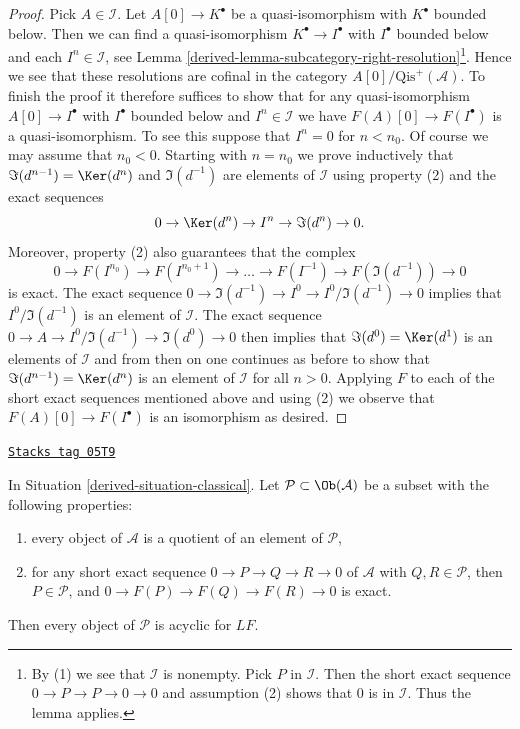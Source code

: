 \begin{proof}

Pick $A \in \mathcal{I}$. Let $A[0] \to K^\bullet$
be a quasi-isomorphism with $K^\bullet$
bounded below. Then we can find a quasi-isomorphism
$K^\bullet \to I^\bullet$ with $I^\bullet$ bounded below and
each $I^n \in \mathcal{I}$, see
Lemma \ref{derived-lemma-subcategory-right-resolution}\footnote{By (1)
we see that $\mathcal{I}$ is nonempty. Pick $P$ in $\mathcal{I}$.
Then the short exact sequence $0 \to P \to P \to 0 \to 0$ and assumption (2)
shows that $0$ is in $\mathcal{I}$. Thus the lemma applies.}.
Hence we see that these resolutions are cofinal in the category
$A[0]/\text{Qis}^{+}(\mathcal{A})$. To finish the proof it therefore
suffices to show that for any quasi-isomorphism
$A[0] \to I^\bullet$ with $I^\bullet$ bounded below and $I^n \in \mathcal{I}$
we have $F(A)[0] \to F(I^\bullet)$ is a quasi-isomorphism.
To see this suppose that $I^n = 0$ for $n < n_0$. Of course we may assume
that $n_0 < 0$. Starting with $n = n_0$ we prove inductively that
$\Im(d^{n - 1}) = \Ker(d^n)$ and $\Im(d^{-1})$
are elements of $\mathcal{I}$ using property (2) and the exact sequences
$$
0 \to \Ker(d^n) \to I^n \to \Im(d^n) \to 0.
$$
Moreover, property (2) also guarantees that the complex
$$
0 \to F(I^{n_0}) \to F(I^{n_0 + 1}) \to \ldots \to F(I^{-1}) \to
F(\Im(d^{-1})) \to 0
$$
is exact. The exact sequence
$0 \to \Im(d^{-1}) \to I^0 \to I^0/\Im(d^{-1}) \to 0$
implies that $I^0/\Im(d^{-1})$ is an element of $\mathcal{I}$.
The exact sequence $0 \to A \to I^0/\Im(d^{-1}) \to \Im(d^0) \to 0$
then implies that $\Im(d^0) = \Ker(d^1)$ is an elements of
$\mathcal{I}$ and from then on one continues as before to show that
$\Im(d^{n - 1}) = \Ker(d^n)$ is an element of $\mathcal{I}$
for all $n > 0$. Applying $F$ to each of the short exact sequences
mentioned above and using (2) we observe that $F(A)[0] \to F(I^\bullet)$
is an isomorphism as desired.
\end{proof}

\begin{lemma}
\label{derived-lemma-subcategory-left-acyclics}
\href{https://stacks.math.columbia.edu/tag/05T9}{\texttt{Stacks tag 05T9}}

In
Situation \ref{derived-situation-classical}.
Let $\mathcal{P} \subset \Ob(\mathcal{A})$ be a subset with the
following properties:
\begin{enumerate}
\item every object of $\mathcal{A}$ is a quotient of an element of
$\mathcal{P}$,
\item for any short exact sequence $0 \to P \to Q \to R \to 0$ of
$\mathcal{A}$ with $Q, R \in \mathcal{P}$, then $P \in \mathcal{P}$,
and $0 \to F(P) \to F(Q) \to F(R) \to 0$ is exact.
\end{enumerate}
Then every object of $\mathcal{P}$ is acyclic for $LF$.
\end{lemma}

